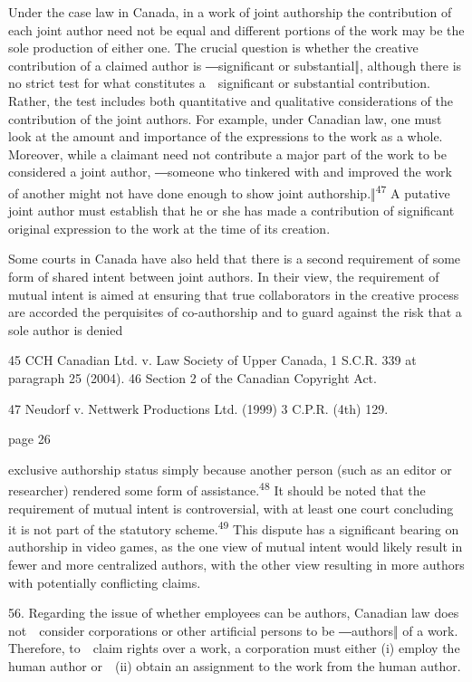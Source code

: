 \documentclass[
]{article}
\begin{document}
{Under the case law in Canada, in a work of joint authorship the
contribution of each joint author need not be equal and different
portions of the work may be the sole production of either one. The
crucial question is whether the creative contribution of a claimed
author is }{―significant or substantial‖, although there is no strict
test for what constitutes a~~significant }{or substantial contribution.
Rather, the test includes both quantitative and qualitative
considerations of the contribution of the joint authors. For example,
under Canadian law, one must look at the amount and importance of the
expressions to the work as a whole. Moreover, while a claimant need not
contribute a major part of the work to be considered }{a joint author,
―}{someone who tinkered with and improved the work of another might not
have done enough to show joint authorship.}{‖}\textsuperscript{{47 }}{A
putative joint author must establish that he or she has made a
contribution of significant original expression to the work at the time
of its creation.}

{Some courts in Canada have also held that there is a second requirement
of some form of shared intent between joint authors. In their view, the
requirement of mutual intent is aimed at ensuring that true
collaborators in the creative process are accorded the perquisites of
co-authorship and to guard against the risk that a sole author is
denied}

{45 }{CCH Canadian Ltd. v. Law Society of Upper Canada, }{1 S.C.R. 339
at paragraph 25 (2004). }{46 }{Section 2 of the Canadian }{Copyright
Act}{.}

{47 }{Neudorf v. Nettwerk Productions Ltd}{. (1999) 3 C.P.R. (4th) 129.}

{page 26}

{exclusive authorship status simply because another person (such as an
editor or researcher) rendered some form of
assistance.}\textsuperscript{{48 }}{It should be noted that the
requirement of mutual intent is controversial, with at least one court
concluding it is not part of the statutory scheme.}\textsuperscript{{49
}}{This dispute has a significant bearing on authorship in video games,
as the one view of mutual intent would likely result in fewer and more
centralized authors, with the other view resulting in more authors with
potentially conflicting claims.}

{56. }{Regarding the issue of whether employees can be authors, Canadian
law does not~~consider corporat}{ions or other artificial persons to be
―}{authors}{‖ of a work}{. Therefore, to~~claim rights over a work, a
corporation must either (i) employ the human author or~~(ii) obtain an
assignment to the work from the human author.}
\end{document}
